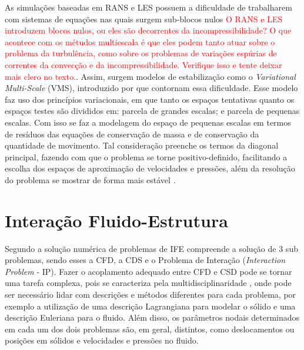 As simulações baseadas em RANS e LES possuem a dificuldade de trabalharem com sistemas de equações nas quais surgem sub-blocos nulos \textcolor{red}{O RANS e LES introduzem blocos nulos, ou eles são decorrentes da incompressibilidade? O que acontece com os métudos multiescala é que eles podem tanto atuar sobre o problema da turbulência, como sobre os problemas de variações espúrias de correntes da convecção e da incompressibilidade. Verifique isso e tente deixar mais clero no texto.}. Assim, surgem modelos de estabilização como o \textit{Variational Multi-Scale} (VMS), introduzido por  que contornam essa dificuldade. Esse modelo faz uso dos princípios variacionais, em que tanto os espaços tentativas quanto os espaços testes são divididos em: parcela de grandes escalas; e parcela de pequenas escalas. Com isso se faz a modelagem do espaço de pequenas escalas em termos de resíduos das equações de conservação de massa e de conservação da quantidade de movimento. Tal consideração preenche os termos da diagonal principal, fazendo com que o problema se torne positivo-definido, facilitando a escolha dos espaços de aproximação de velocidades e pressões, além da resolução do problema se mostrar de forma mais estável \cite{bazilevs2013computational,sondak2015new}.

\section{Interação Fluido-Estrutura} \label{IFE}

Segundo  a solução numérica de problemas de IFE compreende a solução de 3 sub problemas, sendo esses a CFD, a CDS e o Problema de Interação (\textit{Interaction Problem} - IP). Fazer o acoplamento adequado entre CFD e CSD pode se tornar uma tarefa complexa, pois se caracteriza pela multidisciplinaridade \cite{hou2012numerical}, onde pode ser necessário lidar com descrições e métodos diferentes para cada problema, por exemplo a utilização de uma descrição Lagrangiana para modelar o sólido e uma descrição Euleriana para o fluido. Além disso, os parâmetros nodais determinados em cada um dos dois problemas são, em geral, distintos, como deslocamentos ou posições em sólidos e velocidades e pressões no fluido.

